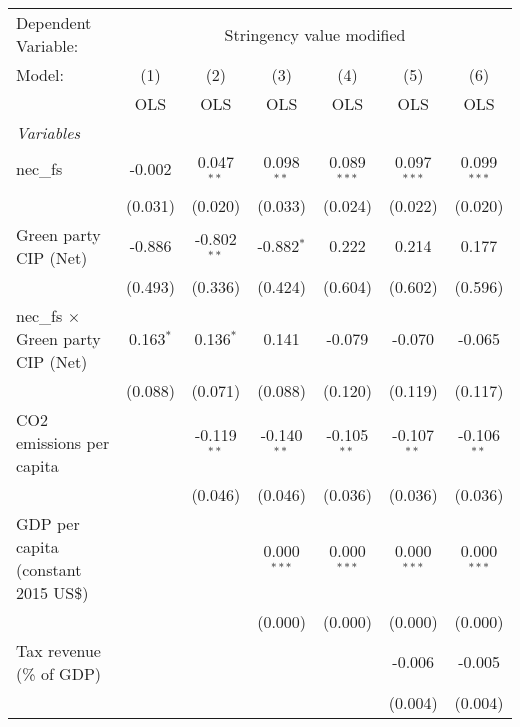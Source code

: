 
\begingroup
\centering
\begin{tabular}{lcccccc}
   \toprule
   Dependent Variable: & \multicolumn{6}{c}{Stringency value modified}\\
   Model:                                   & (1)         & (2)           & (3)           & (4)           & (5)           & (6)\\  
                                            &  OLS        & OLS           & OLS           & OLS           & OLS           & OLS\\  
   \midrule
   \emph{Variables}\\
   nec\_fs                                  & -0.002      & 0.047$^{**}$  & 0.098$^{**}$  & 0.089$^{***}$ & 0.097$^{***}$ & 0.099$^{***}$\\   
                                            & (0.031)     & (0.020)       & (0.033)       & (0.024)       & (0.022)       & (0.020)\\   
   Green party CIP (Net)                    & -0.886      & -0.802$^{**}$ & -0.882$^{*}$  & 0.222         & 0.214         & 0.177\\   
                                            & (0.493)     & (0.336)       & (0.424)       & (0.604)       & (0.602)       & (0.596)\\   
   nec\_fs $\times$ Green party CIP (Net)   & 0.163$^{*}$ & 0.136$^{*}$   & 0.141         & -0.079        & -0.070        & -0.065\\   
                                            & (0.088)     & (0.071)       & (0.088)       & (0.120)       & (0.119)       & (0.117)\\   
   CO2 emissions per capita                 &             & -0.119$^{**}$ & -0.140$^{**}$ & -0.105$^{**}$ & -0.107$^{**}$ & -0.106$^{**}$\\   
                                            &             & (0.046)       & (0.046)       & (0.036)       & (0.036)       & (0.036)\\   
   GDP per capita (constant 2015 US\$)      &             &               & 0.000$^{***}$ & 0.000$^{***}$ & 0.000$^{***}$ & 0.000$^{***}$\\   
                                            &             &               & (0.000)       & (0.000)       & (0.000)       & (0.000)\\   
   Tax revenue (\% of GDP)                  &             &               &               &               & -0.006        & -0.005\\   
                                            &             &               &               &               & (0.004)       & (0.004)\\   

\end{tabular}
